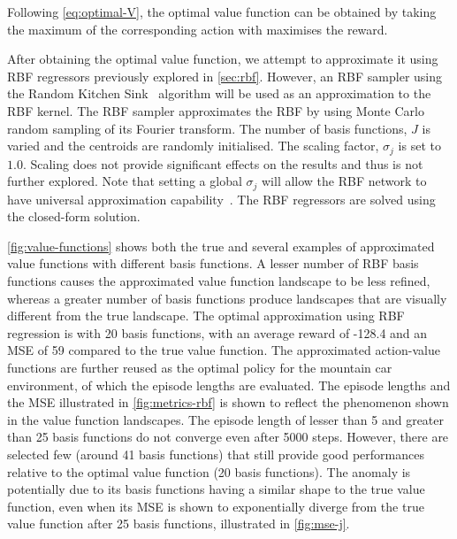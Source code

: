 \documentclass{article}
\begin{document}
Following \cref{eq:optimal-V}, the optimal value function can be obtained by taking the maximum of the corresponding action with maximises the reward.

After obtaining the optimal value function, we attempt to approximate it using RBF regressors previously explored in \cref{sec:rbf}. However, an RBF sampler using the Random Kitchen Sink~\cite{rahimiRandomFeaturesLargeScale} algorithm will be used as an approximation to the RBF kernel. The RBF sampler approximates the RBF by using Monte Carlo random sampling of its Fourier transform. The number of basis functions, $J$ is varied and the centroids are randomly initialised. The scaling factor, $\sigma_j$ is set to $1.0$. Scaling does not provide significant effects on the results and thus is not further explored. Note that setting a global $\sigma_j$ will allow the RBF network to have universal approximation capability~\cite{wuUsingRadialBasis2012}. The RBF regressors are solved using the closed-form solution.

\cref{fig:value-functions} shows both the true and several examples of approximated value functions with different basis functions. A lesser number of RBF basis functions causes the approximated value function landscape to be less refined, whereas a greater number of basis functions produce landscapes that are visually different from the true landscape. The optimal approximation using RBF regression is with 20 basis functions, with an average reward of -128.4 and an MSE of 59 compared to the true value function. The approximated action-value functions are further reused as the optimal policy for the mountain car environment, of which the episode lengths are evaluated. The episode lengths and the MSE illustrated in \cref{fig:metrics-rbf} is shown to reflect the phenomenon shown in the value function landscapes. The episode length of lesser than 5 and greater than 25 basis functions do not converge even after 5000 steps. However, there are selected few (around 41 basis functions) that still provide good performances relative to the optimal value function (20 basis functions). The anomaly is potentially due to its basis functions having a similar shape to the true value function, even when its MSE is shown to exponentially diverge from the true value function after 25 basis functions, illustrated in \cref{fig:mse-j}.
\end{document}
